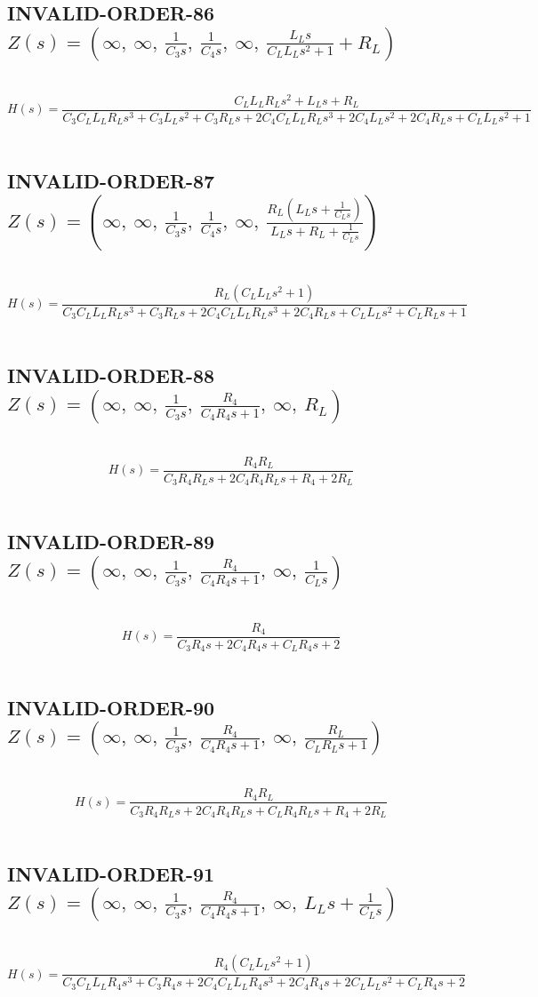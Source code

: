 \documentclass{article}
\begin{document}
\subsection{INVALID-ORDER-86 $Z(s) = \left( \infty, \  \infty, \  \frac{1}{C_{3} s}, \  \frac{1}{C_{4} s}, \  \infty, \  \frac{L_{L} s}{C_{L} L_{L} s^{2} + 1} + R_{L}\right)$ } \ 
\textbf{\[H(s) = \frac{C_{L} L_{L} R_{L} s^{2} + L_{L} s + R_{L}}{C_{3} C_{L} L_{L} R_{L} s^{3} + C_{3} L_{L} s^{2} + C_{3} R_{L} s + 2 C_{4} C_{L} L_{L} R_{L} s^{3} + 2 C_{4} L_{L} s^{2} + 2 C_{4} R_{L} s + C_{L} L_{L} s^{2} + 1}\] } \ 
\subsection{INVALID-ORDER-87 $Z(s) = \left( \infty, \  \infty, \  \frac{1}{C_{3} s}, \  \frac{1}{C_{4} s}, \  \infty, \  \frac{R_{L} \left(L_{L} s + \frac{1}{C_{L} s}\right)}{L_{L} s + R_{L} + \frac{1}{C_{L} s}}\right)$ } \ 
\textbf{\[H(s) = \frac{R_{L} \left(C_{L} L_{L} s^{2} + 1\right)}{C_{3} C_{L} L_{L} R_{L} s^{3} + C_{3} R_{L} s + 2 C_{4} C_{L} L_{L} R_{L} s^{3} + 2 C_{4} R_{L} s + C_{L} L_{L} s^{2} + C_{L} R_{L} s + 1}\] } \ 
\subsection{INVALID-ORDER-88 $Z(s) = \left( \infty, \  \infty, \  \frac{1}{C_{3} s}, \  \frac{R_{4}}{C_{4} R_{4} s + 1}, \  \infty, \  R_{L}\right)$ } \ 
\textbf{\[H(s) = \frac{R_{4} R_{L}}{C_{3} R_{4} R_{L} s + 2 C_{4} R_{4} R_{L} s + R_{4} + 2 R_{L}}\] } \ 
\subsection{INVALID-ORDER-89 $Z(s) = \left( \infty, \  \infty, \  \frac{1}{C_{3} s}, \  \frac{R_{4}}{C_{4} R_{4} s + 1}, \  \infty, \  \frac{1}{C_{L} s}\right)$ } \ 
\textbf{\[H(s) = \frac{R_{4}}{C_{3} R_{4} s + 2 C_{4} R_{4} s + C_{L} R_{4} s + 2}\] } \ 
\subsection{INVALID-ORDER-90 $Z(s) = \left( \infty, \  \infty, \  \frac{1}{C_{3} s}, \  \frac{R_{4}}{C_{4} R_{4} s + 1}, \  \infty, \  \frac{R_{L}}{C_{L} R_{L} s + 1}\right)$ } \ 
\textbf{\[H(s) = \frac{R_{4} R_{L}}{C_{3} R_{4} R_{L} s + 2 C_{4} R_{4} R_{L} s + C_{L} R_{4} R_{L} s + R_{4} + 2 R_{L}}\] } \ 
\subsection{INVALID-ORDER-91 $Z(s) = \left( \infty, \  \infty, \  \frac{1}{C_{3} s}, \  \frac{R_{4}}{C_{4} R_{4} s + 1}, \  \infty, \  L_{L} s + \frac{1}{C_{L} s}\right)$ } \ 
\textbf{\[H(s) = \frac{R_{4} \left(C_{L} L_{L} s^{2} + 1\right)}{C_{3} C_{L} L_{L} R_{4} s^{3} + C_{3} R_{4} s + 2 C_{4} C_{L} L_{L} R_{4} s^{3} + 2 C_{4} R_{4} s + 2 C_{L} L_{L} s^{2} + C_{L} R_{4} s + 2}\] } \ 
\end{document}
